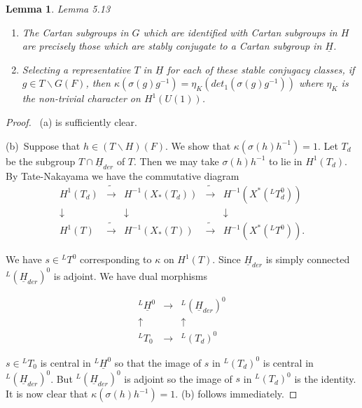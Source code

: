 \documentclass{memo-l}
\newtheorem{lemma}[theorem]{Lemma}
\theoremstyle{definition}
\theoremstyle{remark}
\numberwithin{section}{chapter}
\numberwithin{equation}{chapter}
\begin{document}
\medskip


\begin{lemma}{Lemma 5.13}
\begin{enumerate}[label=\alph*)]
\item The Cartan subgroups in $G$ which are identified with
Cartan subgroups
in $H$ are precisely those which are stably conjugate to a Cartan subgroup
in $\underline{H}$.
\item Selecting a representative $T$ in $\underline{H}$ for each of these stable
conjugacy classes, if $g  \in  T\backslash G(F)$, then
${\kappa}({\sigma}(g)g^{-1})  =  {\eta}_{K}(det_{1}({\sigma}(g)g^{-1}))$
where ${\eta}_{K}$ is the non-trivial character on $H^{1}(U(1))$.
\end{enumerate}
\end{lemma}


\begin{proof} \ (a) is sufficiently clear.

(b)\ Suppose that $h  \in  (T\backslash H)(F)$.  We show that
${\kappa}({\sigma}(h)h^{-1})  = 1$.  Let $T_{d}$ be the subgroup $T {\cap}
\underline{H}_{der}$ of $T$.  Then we may take ${\sigma}(h)h^{-1}$ to lie in
$H^{1}(T_{d})$.  By Tate-Nakayama we have the commutative diagram
$$
\begin{matrix}
H^{1}(T_{d}) & \tilde{\to} & H^{-1}(X_{*}(T_{d})) & \tilde{\to}	&
H^{-1}(X^{*}(^{L}T_{d}^{0})) \\
\downarrow && \downarrow && \downarrow \\
H^{1}(T) & \tilde{\to} & H^{-1}(X_{*}(T)) & \tilde{\to}	&
H^{-1}(X^{*}(^{L}T^{0}))   .
\end{matrix}
$$

\noindent
We have $s  \in {}^{L}T^{0}$ corresponding to ${\kappa}$ on $H^{1}(T)$.
Since $\underline{H}_{der}$ is simply connected ${}^{L}(\underline{H}_{der})^{0}$ is
adjoint.  We have dual morphisms

$$
\begin{matrix}
	 ^{L}\underline{H}^{0} & \to & {}^{L}(\underline{H}_{der})^{0}\\
	 \uparrow && \uparrow \\
	 ^{L}T_{0} &\to & {}^{L}(T_{d})^{0}
	 \end{matrix}
$$


$s  \in  {}^{L}T_{0}$ is central in $^{L}\underline{H}^{0}$ so that the image of
$s$ in $^{L}(T_{d})^{0}$ is central in $^{L}(\underline{H}_{der})^{0}$.  But
$^{L}(\underline{H}_{der})^{0}$ is adjoint so the image of $s$ in
${}^{L}(T_{d})^{0}$ is the identity.  It is now clear that
${\kappa}({\sigma}(h)h^{-1})  =  1$.  (b) follows immediately.
\end{proof}
{\medskip}
\end{document}
